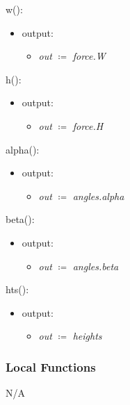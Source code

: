 \documentclass[12pt, titlepage]{article}
\begin{document}
\noindent w():
\begin{itemize}
\item output:
\begin{itemize}
	\item[] \textit{out} $\coloneqq$ \textit{force.W}\\
\end{itemize}
\end{itemize}

\noindent h():
\begin{itemize}
\item output:
\begin{itemize}
	\item[] \textit{out} $\coloneqq$ \textit{force.H}\\
\end{itemize}
\end{itemize}

\noindent alpha():
\begin{itemize}
	\item output:
	\begin{itemize}
		\item[] \textit{out} $\coloneqq$ \textit{angles.alpha}\\
	\end{itemize}
\end{itemize}

\noindent beta():
\begin{itemize}
	\item output:
	\begin{itemize}
		\item[] \textit{out} $\coloneqq$ \textit{angles.beta}\\
	\end{itemize}
\end{itemize}

\noindent hts():
\begin{itemize}
	\item output:
	\begin{itemize}
		\item[] \textit{out} $\coloneqq$ \textit{heights}\\
	\end{itemize}
\end{itemize}

\subsubsection{Local Functions}
N/A

\newpage
\end{document}
